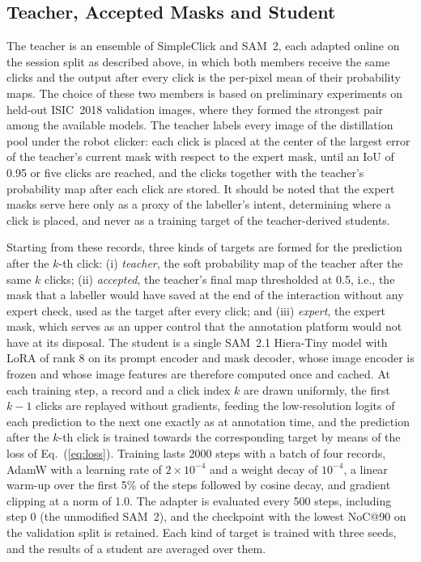 \documentclass[runningheads]{llncs}
\begin{document}
\subsection{Teacher, Accepted Masks and Student}

The teacher is an ensemble of SimpleClick and SAM~2, each adapted online on the session split as described above, in which both members receive the same clicks and the output after every click is the per-pixel mean of their probability maps. The choice of these two members is based on preliminary experiments on held-out ISIC~2018 validation images, where they formed the strongest pair among the available models. The teacher labels every image of the distillation pool under the robot clicker: each click is placed at the center of the largest error of the teacher's current mask with respect to the expert mask, until an IoU of 0.95 or five clicks are reached, and the clicks together with the teacher's probability map after each click are stored. It should be noted that the expert masks serve here only as a proxy of the labeller's intent, determining where a click is placed, and never as a training target of the teacher-derived students.

Starting from these records, three kinds of targets are formed for the prediction after the $k$-th click: (i) \emph{teacher}, the soft probability map of the teacher after the same $k$ clicks; (ii) \emph{accepted}, the teacher's final map thresholded at 0.5, i.e., the mask that a labeller would have saved at the end of the interaction without any expert check, used as the target after every click; and (iii) \emph{expert}, the expert mask, which serves as an upper control that the annotation platform would not have at its disposal. The student is a single SAM~2.1 Hiera-Tiny model with LoRA of rank 8 on its prompt encoder and mask decoder, whose image encoder is frozen and whose image features are therefore computed once and cached. At each training step, a record and a click index $k$ are drawn uniformly, the first $k-1$ clicks are replayed without gradients, feeding the low-resolution logits of each prediction to the next one exactly as at annotation time, and the prediction after the $k$-th click is trained towards the corresponding target by means of the loss of Eq.~(\ref{eq:loss}). Training lasts 2000 steps with a batch of four records, AdamW with a learning rate of $2\times10^{-4}$ and a weight decay of $10^{-4}$, a linear warm-up over the first 5\% of the steps followed by cosine decay, and gradient clipping at a norm of 1.0. The adapter is evaluated every 500 steps, including step 0 (the unmodified SAM~2), and the checkpoint with the lowest NoC@90 on the validation split is retained. Each kind of target is trained with three seeds, and the results of a student are averaged over them.
\end{document}
